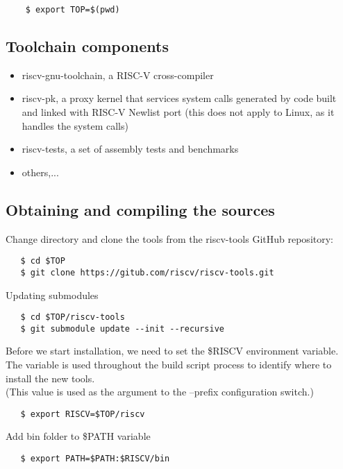 \begin{verbatim}
    $ export TOP=$(pwd)
\end{verbatim}

\newpage 

\subsection{Toolchain components}

\begin{itemize}
\item riscv-gnu-toolchain, a RISC-V cross-compiler
\item riscv-pk, a proxy kernel that services system calls generated by code built \\and linked with RISC-V Newlist port (this does not apply to Linux, as it handles the system calls)
\item riscv-tests, a set of assembly tests and benchmarks
\item others,...
\end{itemize}

\subsection{Obtaining and compiling the sources}
Change directory and clone the tools from the riscv-tools GitHub repository:
\begin{verbatim}
   $ cd $TOP
   $ git clone https://gitub.com/riscv/riscv-tools.git
\end{verbatim}

Updating submodules
\begin{verbatim}
   $ cd $TOP/riscv-tools
   $ git submodule update --init --recursive
\end{verbatim}

Before we start installation, we need to set the \$RISCV environment variable. \\The variable is used throughout the build script process to identify where to install the new tools. \\(This value is used as the argument to the --prefix configuration switch.)

\begin{verbatim}
   $ export RISCV=$TOP/riscv
\end{verbatim}

Add bin folder to \$PATH variable

\begin{verbatim}
   $ export PATH=$PATH:$RISCV/bin
\end{verbatim}

